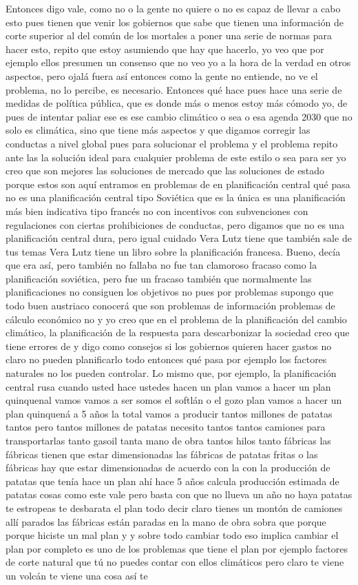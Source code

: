 Entonces digo vale, como no o la gente no quiere o no es capaz de llevar a cabo esto pues tienen que venir los gobiernos que sabe que tienen una información de corte superior al del común de los mortales a poner una serie de normas para hacer esto, repito que estoy asumiendo que hay que hacerlo, yo veo que por ejemplo ellos presumen un consenso que no veo yo a la hora de la verdad en otros aspectos, pero ojalá fuera así entonces como la gente no entiende, no ve el problema, no lo percibe, es necesario. Entonces qué hace pues hace una serie de medidas de política pública, que es donde más o menos estoy más cómodo yo, de pues de intentar paliar ese es ese cambio climático o sea o esa agenda 2030 que no solo es climática, sino que tiene más aspectos y que digamos corregir las conductas a nivel global pues para solucionar el problema y el problema repito ante las la solución ideal para cualquier problema de este estilo o sea para ser yo creo que son mejores las soluciones de mercado que las soluciones de estado porque estos son aquí entramos en problemas de en planificación central qué pasa no es una planificación central tipo Soviética que es la única es una planificación más bien indicativa tipo francés no con incentivos con subvenciones con regulaciones con ciertas prohibiciones de conductas, pero digamos que no es una planificación central dura, pero igual cuidado Vera Lutz tiene que también sale de tus temas Vera Lutz tiene un libro sobre la planificación francesa. Bueno, decía que era así, pero también no fallaba no fue tan clamoroso fracaso como la planificación soviética, pero fue un fracaso también que normalmente las planificaciones no consiguen los objetivos no pues por problemas supongo que todo buen austriaco conocerá que son problemas de información problemas de cálculo económico no y yo creo que en el problema de la planificación del cambio climático, la planificación de la respuesta para descarbonizar la sociedad creo que tiene errores de y digo como consejos si los gobiernos quieren hacer gastos no claro no pueden planificarlo todo entonces qué pasa por ejemplo los factores naturales no los pueden controlar. Lo mismo que, por ejemplo, la planificación central rusa cuando usted hace ustedes hacen un plan vamos a hacer un plan quinquenal vamos vamos a ser somos el softlán o el gozo plan vamos a hacer un plan quinquená a 5 años la total vamos a producir tantos millones de patatas tantos pero tantos millones de patatas necesito tantos tantos camiones para transportarlas tanto gasoil tanta mano de obra tantos hilos tanto fábricas las fábricas tienen que estar dimensionadas las fábricas de patatas fritas o las fábricas hay que estar dimensionadas de acuerdo con la con la producción de patatas que tenía hace un plan ahí hace 5 años calcula producción estimada de patatas cosas como este vale pero basta con que no llueva un año no haya patatas te estropeas te desbarata el plan todo decir claro tienes un montón de camiones allí parados las fábricas están paradas en la mano de obra sobra que porque porque hiciste un mal plan y y sobre todo cambiar todo eso implica cambiar el plan por completo es uno de los problemas que tiene el plan por ejemplo factores de corte natural que tú no puedes contar con ellos climáticos pero claro te viene un volcán te viene una cosa así te 